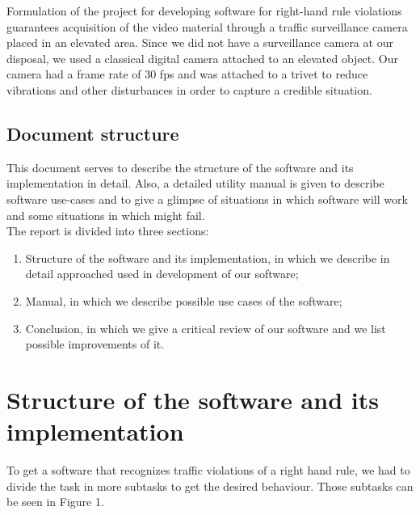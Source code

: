 \documentclass[12pt]{article} %
\begin{document}
Formulation of the project for developing software for right-hand rule violations guarantees acquisition of the video material through a traffic surveillance camera placed in an elevated area. 
Since we did not have a surveillance camera at our disposal, we used a classical digital camera attached to an elevated object. Our camera had a frame rate of 30 fps and was attached to a trivet to reduce vibrations and other disturbances in order to capture a credible situation.




\subsection{Document structure}

This document serves to describe the structure of the software and its implementation in detail. Also, a detailed utility manual is given to describe software use-cases and to give a glimpse of situations in which software will work and some situations in which might fail.
\\

The report is divided into three sections:
\begin{enumerate}
\item Structure of the software and its implementation, in which we describe in detail approached used in development of our software;
\item Manual, in which we describe possible use cases of the software;
\item Conclusion, in which we give a critical review of our software and we list possible improvements of it. 
\end{enumerate}




\section{Structure of the software and its implementation} %

To get a software that recognizes traffic violations of a right hand rule, we had to divide the task in more subtasks to get the desired behaviour. Those subtasks can be seen in Figure 1.
\end{document}
